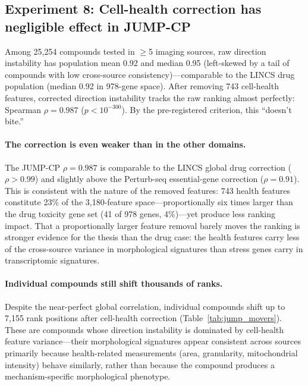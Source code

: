 \documentclass{article}
\begin{document}
\subsection{Experiment 8: Cell-health correction has negligible effect in JUMP-CP}

Among 25{,}254 compounds tested in $\geq$5 imaging sources, raw direction
instability has population mean 0.92 and median 0.95 (left-skewed by a
tail of compounds with low cross-source consistency)---comparable to the
LINCS drug population (median 0.92 in 978-gene space). After removing 743
cell-health features, corrected direction instability tracks the raw ranking
almost perfectly: Spearman $\rho = 0.987$ ($p < 10^{-300}$). By the
pre-registered criterion, this ``doesn't bite.''

\paragraph{The correction is even weaker than in the other domains.}
The JUMP-CP $\rho = 0.987$ is comparable to the LINCS global drug
correction ($\rho > 0.99$) and slightly above the Perturb-seq
essential-gene correction ($\rho = 0.91$). This
is consistent with the nature of the removed features: 743 health features
constitute 23\% of the 3{,}180-feature space---proportionally six times
larger than the drug toxicity gene set (41 of 978 genes, 4\%)---yet produce
less ranking impact. That a proportionally larger feature removal barely
moves the ranking is stronger evidence for the thesis than the drug case:
the health features carry less of the cross-source variance in
morphological signatures than stress genes carry in transcriptomic
signatures.

\paragraph{Individual compounds still shift thousands of ranks.}
Despite the near-perfect global correlation, individual compounds shift up
to 7{,}155 rank positions after cell-health correction
(Table~\ref{tab:jump_movers}). These are compounds whose direction
instability is dominated by cell-health feature variance---their
morphological signatures appear consistent across sources primarily because
health-related measurements (area, granularity, mitochondrial intensity)
behave similarly, rather than because the compound produces a
mechanism-specific morphological phenotype.
\end{document}
